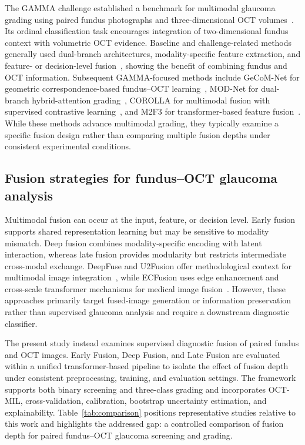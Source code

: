 \documentclass[sn-mathphys]{sn-jnl}%
\theoremstyle{thmstyleone}%
\theoremstyle{thmstyletwo}%
\theoremstyle{thmstylethree}%
\begin{document}
The GAMMA challenge established a benchmark for multimodal glaucoma grading using paired fundus photographs and three-dimensional OCT volumes~\cite{wu2023gamma}. Its ordinal classification task encourages integration of two-dimensional fundus context with volumetric OCT evidence. Baseline and challenge-related methods generally used dual-branch architectures, modality-specific feature extraction, and feature- or decision-level fusion~\cite{wu2023gamma}, showing the benefit of combining fundus and OCT information. Subsequent GAMMA-focused methods include GeCoM-Net for geometric correspondence-based fundus--OCT learning~\cite{wang2024geometric}, MOD-Net for dual-branch hybrid-attention grading~\cite{wang2025dual}, COROLLA for multimodal fusion with supervised contrastive learning~\cite{cai2022corolla}, and M2F3 for transformer-based feature fusion~\cite{zhao2025enhancing}. While these methods advance multimodal grading, they typically examine a specific fusion design rather than comparing multiple fusion depths under consistent experimental conditions.

\subsection{Fusion strategies for fundus--OCT glaucoma analysis}
\label{subsec:fusion_strategies}

Multimodal fusion can occur at the input, feature, or decision level. Early fusion supports shared representation learning but may be sensitive to modality mismatch. Deep fusion combines modality-specific encoding with latent interaction, whereas late fusion provides modularity but restricts intermediate cross-modal exchange. DeepFuse and U2Fusion offer methodological context for multimodal image integration~\cite{ram2017deepfuse,xu2020u2fusion}, while ECFusion uses edge enhancement and cross-scale transformer mechanisms for medical image fusion~\cite{luo2025novel}. However, these approaches primarily target fused-image generation or information preservation rather than supervised glaucoma analysis and require a downstream diagnostic classifier.

The present study instead examines supervised diagnostic fusion of paired fundus and OCT images. Early Fusion, Deep Fusion, and Late Fusion are evaluated within a unified transformer-based pipeline to isolate the effect of fusion depth under consistent preprocessing, training, and evaluation settings. The framework supports both binary screening and three-class grading and incorporates OCT-MIL, cross-validation, calibration, bootstrap uncertainty estimation, and explainability. Table~\ref{tab:comparison} positions representative studies relative to this work and highlights the addressed gap: a controlled comparison of fusion depth for paired fundus--OCT glaucoma screening and grading.
\end{document}
